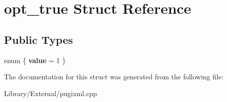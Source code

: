\hypertarget{structopt__true}{}\section{opt\+\_\+true Struct Reference}
\label{structopt__true}
\subsection*{Public Types}
\begin{DoxyCompactItemize}
\item 
\hypertarget{structopt__true_a81afe29fe37008c16960c1d868342173}{}enum \{ {\bfseries value} = 1
 \}\label{structopt__true_a81afe29fe37008c16960c1d868342173}

\end{DoxyCompactItemize}


The documentation for this struct was generated from the following file\+:\begin{DoxyCompactItemize}
\item 
Library/\+External/pugixml.\+cpp\end{DoxyCompactItemize}
